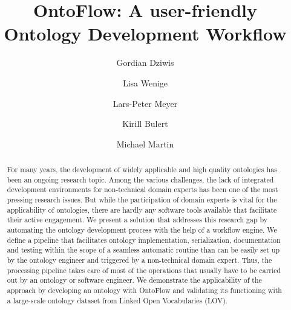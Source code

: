 \documentclass[runningheads]{llncs}
\begin{document}
\title{OntoFlow: A user-friendly Ontology Development Workflow}

\author{Gordian Dziwis \and Lisa Wenige \and Lars-Peter Meyer \and Kirill Bulert \and Michael Martin}

%

\maketitle

\begin{abstract}
	For many years, the development of widely applicable and high quality ontologies has been an ongoing research topic. Among the various challenges, the lack of integrated development environments for non-technical domain experts has been one of the most pressing research issues. But while the participation of domain experts is vital for the applicability of ontologies, there are hardly any software tools available that facilitate their active engagement. We present a solution that addresses this research gap by automating the ontology development process with the help of a workflow engine. We define a pipeline that facilitates ontology implementation, serialization, documentation and testing within the scope of a seamless automatic routine than can be easily set up by the ontology engineer and triggered by a non-technical domain expert. Thus, the processing pipeline takes care of most of the operations that usually have to be carried out by an ontology or software engineer. We demonstrate the applicability of the approach by developing an ontology with OntoFlow and validating its functioning with a large-scale ontology dataset from Linked Open Vocabularies (LOV).
\end{abstract}
\end{document}
